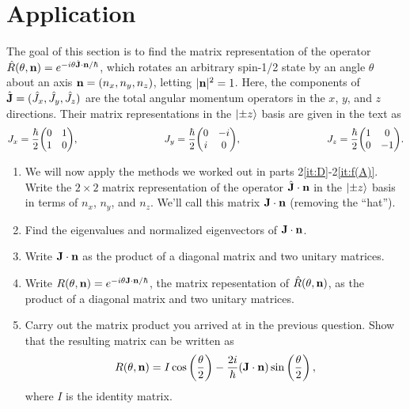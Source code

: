 \documentclass{article}
\begin{document}
\section{Application}
\noindent
The goal of this section is to find the matrix representation of the operator
$\hat{R}(\theta, \vb{n}) = e^{-i\theta\hat{\vb{J}}\cdot\vb{n}/\hbar}$, which rotates an arbitrary spin-1/2 state by an angle $\theta$ about an axis $\vb{n} = (n_x, n_y, n_z)$, letting $|\vb{n}|^2 = 1$.  Here, the components of $\hat{\vb{J}} = (\hat{J}_x, \hat{J}_y, \hat{J}_z)$ are the total angular momentum operators in the $x$, $y$, and $z$ directions. Their matrix representations in the $\ket{\pm z}$ basis are given in the text as
\begin{equation}
J_x = \frac{\hbar}{2}\mqty(0&1\\1&0),
\hspace{3cm}
J_y = \frac{\hbar}{2}\mqty(0&-i\\i&0),
\hspace{3cm}
J_z = \frac{\hbar}{2}\mqty(1&0\\0&-1).
\end{equation}
%
    \begin{enumerate}[label=(\alph*)]
      \item We will now apply the methods we worked out in parts 2\ref{it:D}-2\ref{it:f(A)}.  Write the $2\times2$ matrix representation of the operator $\hat{\vb{J}}\cdot\vb{n}$ in the $\ket{\pm z}$ basis in terms of $n_x$, $n_y$, and $n_z$. We'll call this matrix $\vb{J}\cdot\vb{n}$ (removing the ``hat'').
      \vspace{2.5cm}
      \item Find the eigenvalues and normalized eigenvectors of $\vb{J}\cdot\vb{n}$.
      \vspace{2.5cm}
      \item Write $\vb{J}\cdot\vb{n}$ as the product of a diagonal matrix and two unitary matrices.
      \vspace{2.5cm}
      \item Write $R(\theta, \vb{n}) = e^{-i\theta\vb{J}\cdot\vb{n}/\hbar}$, the matrix repesentation of $\hat{R}(\theta, \vb{n})$, as the product of a diagonal matrix and two unitary matrices.
      \vspace{2.5cm}
      \item Carry out the matrix product you arrived at in the previous question. Show that the resulting matrix can be written as
      \begin{equation}
      R(\theta,\vb{n})
      =
      I\cos\left(\frac{\theta}{2}\right)
      -
      \frac{2i}{\hbar}(\vb{J}\cdot\vb{n})\sin\left(\frac{\theta}{2}\right),
      \end{equation}
      where $I$ is the identity matrix.
      \vspace{2.5cm}
    \end{enumerate}
\newpage
\end{document}
